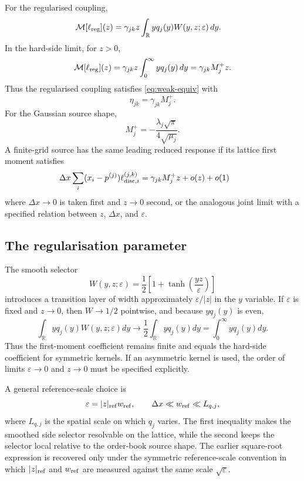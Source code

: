\documentclass[5p,final]{elsarticle}
\begin{document}
For the regularised coupling,
\begin{align}
\mathcal M[\ell_{\rm reg}](z)
&=\gamma_{jk}z\int_{\mathbb R}yq_j(y)W(y,z;\varepsilon)\,dy.
\end{align}
In the hard-side limit, for $z>0$,
\begin{equation}
\mathcal M[\ell_{\rm reg}](z)
=\gamma_{jk}z\int_0^\infty yq_j(y)\,dy
=\gamma_{jk}M_j^+z.
\end{equation}
Thus the regularised coupling satisfies \eqref{eq:weak-equiv} with
\begin{equation}
\eta_{jk}=\gamma_{jk}M_j^+.
\end{equation}
For the Gaussian source shape,
\begin{equation}
M_j^+=-\frac{\lambda_j\sqrt\pi}{4\sqrt{\mu_j}}.
\end{equation}
A finite-grid source has the same leading reduced response if its lattice first moment satisfies
\begin{equation}
\Delta x\sum_i (x_i-p^{(j)})\ell_{{\rm disc},i}^{(j,k)}
=\gamma_{jk}M_j^+z+o(z)+o(1)
\qquad
\label{eq:lattice-moment-match}
\end{equation}
where $\Delta x\to0$ is taken first and $z\to0$ second, or the analogous joint limit with a specified relation between $z$, $\Delta x$, and $\varepsilon$.

\subsection{The regularisation parameter}

The smooth selector
\begin{equation}
W(y,z;\varepsilon)=\frac12\left[1+\tanh\left(\frac{yz}{\varepsilon}\right)\right]
\end{equation}
introduces a transition layer of width approximately $\varepsilon/|z|$ in the $y$ variable.  If $\varepsilon$ is fixed and $z\to0$, then $W\to1/2$ pointwise, and because $yq_j(y)$ is even,
\begin{equation}
\int_{\mathbb R}yq_j(y)W(y,z;\varepsilon)dy
\to \frac12\int_{\mathbb R}yq_j(y)dy
=\int_0^\infty yq_j(y)dy.
\end{equation}
Thus the first-moment coefficient remains finite and equals the hard-side coefficient for symmetric kernels.  If an asymmetric kernel is used, the order of limits $\varepsilon\to0$ and $z\to0$ must be specified explicitly.

A general reference-scale choice is
\begin{equation}
\varepsilon=|z|_{\rm ref}w_{\rm ref},
\qquad
\Delta x\ll w_{\rm ref}\ll L_{q,j},
\end{equation}
where $L_{q,j}$ is the spatial scale on which $q_j$ varies. The first inequality makes the smoothed side selector resolvable on the lattice, while the second keeps the selector local relative to the order-book source shape. The earlier square-root expression is recovered only under the symmetric reference-scale convention in which $|z|_{\rm ref}$ and $w_{\rm ref}$ are measured against the same scale $\sqrt{\varepsilon}$.
\end{document}
